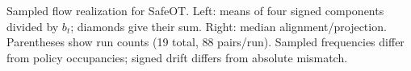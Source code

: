 Sampled flow realization for SafeOT. Left: means of four signed components divided by $b_t$; diamonds give their sum. Right: median alignment/projection. Parentheses show run counts (19 total, 88 pairs/run). Sampled frequencies differ from policy occupancies; signed drift differs from absolute mismatch.
